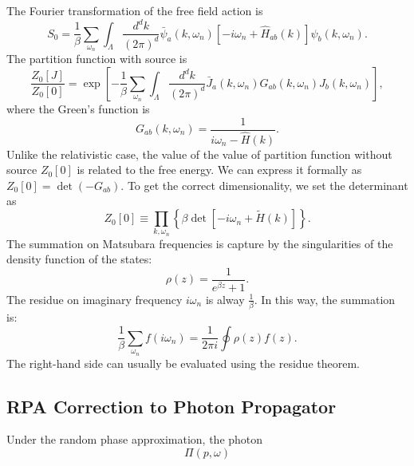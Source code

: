 \documentclass[aps,prb,superscriptaddress,nofootinbib]{revtex4}
\begin{document}
The Fourier transformation of the free field action is
\begin{equation}
	S_0 = \frac{1}{\beta}\sum_{\omega_n} \int_{\Lambda} \frac{d^dk}{(2\pi)^d}
	\bar{\psi}_a(k,\omega_n)\left[-i\omega_n + \hat{H}_{ab}(k)\right]\psi_b(k,\omega_n).
\end{equation}
The partition function with source is
\begin{equation}
	\frac{Z_0[J]}{Z_0[0]} = \exp\left[-\frac{1}{\beta}\sum_{\omega_n} \int_{\Lambda} \frac{d^dk}{(2\pi)^d}\bar J_a(k,\omega_n) G_{ab}(k,\omega_n) J_b(k,\omega_n) \right],
\end{equation}
where the Green's function is 
\begin{equation}
	G_{ab}(k,\omega_n) = \frac{1}{i\omega_n - \hat H(k)}.
\end{equation}
Unlike the relativistic case, the value of the value of partition function without source $Z_0[0]$ is related to the free energy.
We can express it formally as $Z_0[0]= \det (-G_{ab})$.
To get the correct dimensionality, we set the determinant as 
\begin{equation}
	Z_0[0] \equiv \prod_{k,\omega_n}\left\{\beta \det\left[-i\omega_n+\tilde{H}(k)\right]\right\}.
\end{equation}
The summation on Matsubara frequencies is capture by the singularities of the density function of the states:
\begin{equation}
	\rho(z) = \frac{1}{e^{\beta z}+1}.
\end{equation}
The residue on imaginary frequency $i\omega_n$ is alway $\frac{1}{\beta}$. In this way, the summation is:
\begin{equation}
	\frac{1}{\beta}\sum_{\omega_n} f(i\omega_n) 
	= \frac{1}{2\pi i} \oint \rho(z)f(z).
\end{equation}
The right-hand side can usually be evaluated using the residue theorem.



\subsection{RPA Correction to Photon Propagator}
Under the random phase approximation, the photon 
\begin{equation}
	\Pi(p,\omega) 
\end{equation}
\end{document}
